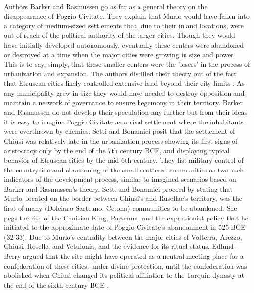 \documentclass[12pt,a4paper]{thesis}
\begin{document}
\paragraph{}
Authors Barker and Rasmussen go as far as a general theory on the disappearance of Poggio Civitate. They explain that Murlo would have fallen into a category of medium-sized settlements that, due to their inland locations, were out of reach of the political authority of the larger cities. Though they would have initially developed autonomously, eventually these centers were abandoned or destroyed at a time when the major cities were growing in size and power. This is to say, simply, that these smaller centers were the 'losers' in the process of urbanization and expansion. The authors distilled their theory out of the fact that Etruscan cities likely controlled extensive land beyond their city limits \cite[p. 100,176]{BarRas98}. As any municipality grew in size they would have needed to destroy opposition and maintain a network of governance to ensure hegemony in their territory. Barker and Rasmussen do not develop their speculation any further but from their ideas it is easy to imagine Poggio Civitate as a rival settlement where the inhabitants were overthrown by enemies. Setti and Bonamici \citeyearpar{SetBon85} posit that the settlement of Chiusi was relatively late in the urbanization process showing its first signs of aristocracy only by the end of the 7th century BCE, and displaying typical behavior of Etruscan cities by the mid-6th century. They list military control of the countryside and abandoning of the small scattered communities as two such indicators of the development process, similar to imagined scenarios based on Barker and Rasmussen's theory. Setti and Bonamici proceed by stating that Murlo, located on the border between Chiusi's and Rusellae's territory, was the first of many (Dolciano Sarteano, Cetona) communities to be abandoned. She pegs the rise of the Chuisian King, Porsenna, and the expansionist policy that he initiated to the approximate date of Poggio Civitate's abandonment in 525 BCE (32-33). Due to Murlo's centrality between the major cities of Volterra, Arezzo, Chiusi, Roselle, and Vetulonia, and the evidence for its ritual status, Edlund-Berry \citeyearpar{IEB94} argued that the site might have operated as a neutral meeting place for a confederation of these cities, under divine protection, until the confederation was abolished when Chiusi changed its political affiliation to the Tarquin dynasty at the end of the sixth century BCE \cite[p. 176-177]{BarRas98}.
\end{document}
